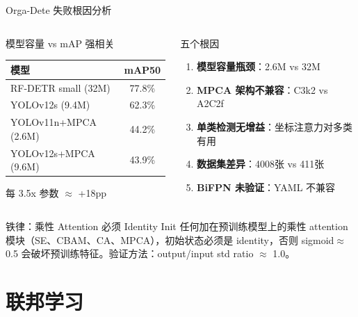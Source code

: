 \documentclass[aspectratio=169, 10pt]{beamer}
\begin{document}
\begin{frame}{Orga-Dete 失败根因分析}
  \begin{columns}[T]
    \begin{block}{模型容量 vs mAP 强相关}
      \begin{tabular}{lc}
        \toprule
        模型 & mAP50 \\
        \midrule
        RF-DETR small (32M) & 77.8\% \\
        YOLOv12s (9.4M) & 62.3\% \\
        YOLOv11n+MPCA (2.6M) & 44.2\% \\
        YOLOv12s+MPCA (9.6M) & 43.9\% \\
        \bottomrule
      \end{tabular}
      \vspace{0.3em}
      
      每 3.5x 参数 $\approx$ +18pp
    \end{block}
    \begin{block}{五个根因}
      \begin{enumerate}
        \item \textbf{模型容量瓶颈}：2.6M vs 32M
        \item \textbf{MPCA 架构不兼容}：C3k2 vs A2C2f
        \item \textbf{单类检测无增益}：坐标注意力对多类有用
        \item \textbf{数据集差异}：4008张 vs 411张
        \item \textbf{BiFPN 未验证}：YAML 不兼容
      \end{enumerate}
    \end{block}
  \end{columns}
  \vspace{0em}
  \begin{alertblock}{铁律：乘性 Attention 必须 Identity Init}
    任何加在预训练模型上的乘性 attention 模块（SE、CBAM、CA、MPCA），初始状态必须是 identity，否则 sigmoid$\approx$0.5 会破坏预训练特征。验证方法：output/input std ratio $\approx$ 1.0。
  \end{alertblock}
\end{frame}

\section{联邦学习}
\end{document}
